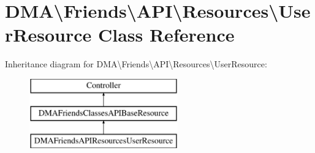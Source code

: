 \hypertarget{classDMA_1_1Friends_1_1API_1_1Resources_1_1UserResource}{}\section{D\+M\+A\textbackslash{}Friends\textbackslash{}A\+P\+I\textbackslash{}Resources\textbackslash{}User\+Resource Class Reference}
\label{classDMA_1_1Friends_1_1API_1_1Resources_1_1UserResource}
Inheritance diagram for D\+M\+A\textbackslash{}Friends\textbackslash{}A\+P\+I\textbackslash{}Resources\textbackslash{}User\+Resource\+:\begin{figure}[H]
\begin{center}
\leavevmode
\includegraphics[height=3.000000cm]{dd/d80/classDMA_1_1Friends_1_1API_1_1Resources_1_1UserResource}
\end{center}
\end{figure}
